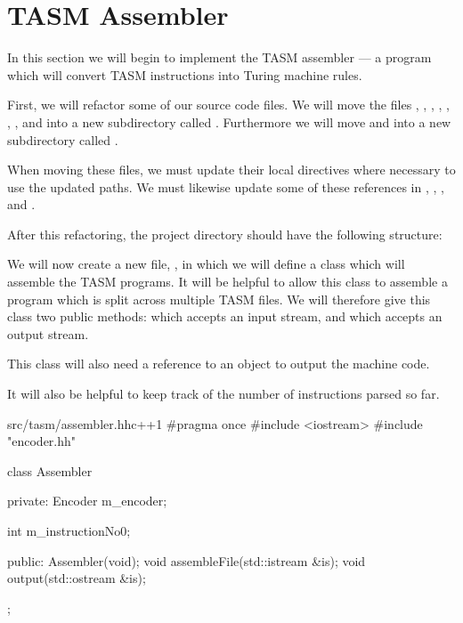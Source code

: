 \section{TASM Assembler}

In this section we will begin to implement the TASM assembler --- a program which will convert TASM instructions into Turing machine rules.

First, we will refactor some of our source code files. We will move the files , , , , , , , and  into a new subdirectory called . Furthermore we will move  and  into a new subdirectory called .

When moving these files, we must update their local  directives where necessary to use the updated paths. We must likewise update some of these references in , , , and .

After this refactoring, the project directory should have the following structure:


We will now create a new file, , in which we will define a class which will assemble the TASM programs. It will be helpful to allow this class to assemble a program which is split across multiple TASM files. We will therefore give this class two public methods:  which accepts an input stream, and  which accepts an output stream.

This class will also need a reference to an  object to output the machine code.

It will also be helpful to keep track of the number of instructions parsed so far.

\begin{file}{src/tasm/assembler.hh}{c++}{1}
#pragma once
#include <iostream>
#include "encoder.hh"

class Assembler
{
private:
    Encoder m_encoder;

    int m_instructionNo{0};

public:
    Assembler(void);
    void assembleFile(std::istream &is);
    void output(std::ostream &is);
};
\end{file}

